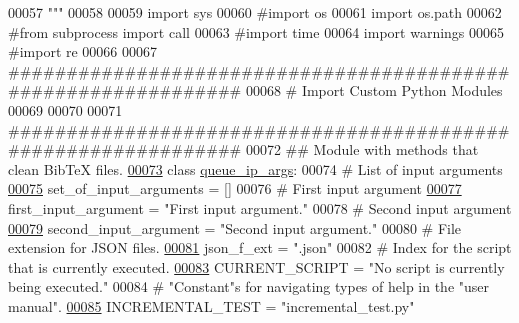 \begin{DoxyCode}
00057 \textcolor{stringliteral}{"""}
00058 
00059 \textcolor{keyword}{import} sys
00060 \textcolor{comment}{#import os}
00061 \textcolor{keyword}{import} os.path
00062 \textcolor{comment}{#from subprocess import call}
00063 \textcolor{comment}{#import time}
00064 \textcolor{keyword}{import} warnings
00065 \textcolor{comment}{#import re}
00066 
00067 \textcolor{comment}{###############################################################}
00068 \textcolor{comment}{#   Import Custom Python Modules}
00069 
00070 
00071 \textcolor{comment}{###############################################################}
00072 \textcolor{comment}{##  Module with methods that clean BibTeX files.}
\hypertarget{queue__ip__arguments_8py_source_l00073}{}\hyperlink{classutilities_1_1queue__ip__arguments_1_1queue__ip__args}{00073} \textcolor{keyword}{class }\hyperlink{classutilities_1_1queue__ip__arguments_1_1queue__ip__args}{queue\_ip\_args}:
00074     \textcolor{comment}{#   List of input arguments}
\hypertarget{queue__ip__arguments_8py_source_l00075}{}\hyperlink{classutilities_1_1queue__ip__arguments_1_1queue__ip__args_acc8e7685be71a7f95ede7c980355c9f3}{00075}     set\_of\_input\_arguments = []
00076     \textcolor{comment}{#   First input argument}
\hypertarget{queue__ip__arguments_8py_source_l00077}{}\hyperlink{classutilities_1_1queue__ip__arguments_1_1queue__ip__args_a14394c9820086e09d5b926d9910a180f}{00077}     first\_input\_argument = \textcolor{stringliteral}{"First input argument."}
00078     \textcolor{comment}{#   Second input argument}
\hypertarget{queue__ip__arguments_8py_source_l00079}{}\hyperlink{classutilities_1_1queue__ip__arguments_1_1queue__ip__args_a0b179a70c0e57de2794d0d532e534c9c}{00079}     second\_input\_argument = \textcolor{stringliteral}{"Second input argument."}
00080     \textcolor{comment}{#   File extension for JSON files.}
\hypertarget{queue__ip__arguments_8py_source_l00081}{}\hyperlink{classutilities_1_1queue__ip__arguments_1_1queue__ip__args_a8d93f9ade7608583602a9948c0d744f7}{00081}     json\_f\_ext = \textcolor{stringliteral}{".json"}
00082     \textcolor{comment}{# Index for the script that is currently executed.}
\hypertarget{queue__ip__arguments_8py_source_l00083}{}\hyperlink{classutilities_1_1queue__ip__arguments_1_1queue__ip__args_a453711109bd635e6263a99c8e85e3dff}{00083}     CURRENT\_SCRIPT = \textcolor{stringliteral}{"No script is currently being executed."}
00084     \textcolor{comment}{# "Constant"s for navigating types of help in the "user manual".}
\hypertarget{queue__ip__arguments_8py_source_l00085}{}\hyperlink{classutilities_1_1queue__ip__arguments_1_1queue__ip__args_a849b659d7a9d7689c4c707502d1684d5}{00085}     INCREMENTAL\_TEST = \textcolor{stringliteral}{"incremental\_test.py"}

\end{DoxyCode}
